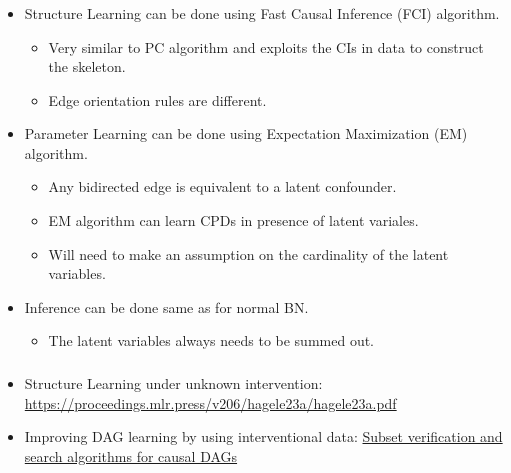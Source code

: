 \documentclass{beamer}
\begin{document}
\begin{frame}
	\frametitle{}
	\begin{itemize}
		\item Structure Learning can be done using Fast Causal Inference (FCI) algorithm.
			\begin{itemize}
				\item Very similar to PC algorithm and exploits the CIs in data to construct the skeleton.
				\item Edge orientation rules are different.
			\end{itemize}
		\item Parameter Learning can be done using Expectation Maximization (EM) algorithm.
			\begin{itemize}
				\item Any bidirected edge is equivalent to a latent confounder.
				\item EM algorithm can learn CPDs in presence of latent variales.
				\item Will need to make an assumption on the cardinality of the latent variables.
			\end{itemize}
		\item Inference can be done same as for normal BN.
			\begin{itemize}
				\item The latent variables always needs to be summed out.
			\end{itemize}
	\end{itemize}
\end{frame}

\begin{frame}
	\frametitle{}
	\begin{itemize}
		\item Structure Learning under unknown intervention:  \url{https://proceedings.mlr.press/v206/hagele23a/hagele23a.pdf}
		\item Improving DAG learning by using interventional data: \url{Subset verification and search algorithms for causal DAGs}
	\end{itemize}
\end{frame}
\end{document}
